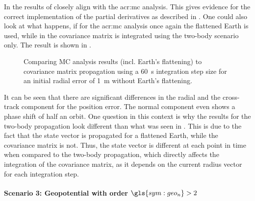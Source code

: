 In  the results of \neptune{} closely align with the \gls{acr:mc} analysis. This gives evidence for the correct implementation of the partial derivatives as described in . One could also look at what happens, if for the \gls{acr:mc} analysis once again the flattened Earth is used, while in \neptune{} the covariance matrix is integrated using the two-body scenario only. The result is shown in .
\begin{figure}[h!]
  \centering
  \hspace{1cm}
  \caption{Comparing MC analysis results (incl. Earth's flattening) to \neptune{} covariance matrix propagation using a \SI{60}{\second} integration step size for an initial radial error of \SI{1}{\metre} without Earth's flattening. \label{fig:val-cov-scen2-02}}
\end{figure}
It can be seen that there are significant differences in the radial and the cross-track component for the position error. The normal component even shows a phase shift of half an orbit. One question in this context is why the \neptune{} results for the two-body propagation look different than what was seen in 
. This is due to the fact that the state vector is propagated for a flattened Earth, while the covariance matrix is not. Thus, the state vector is different at each point in time when compared to the two-body propagation, which directly affects the integration of the covariance matrix, as it depends on the current radius vector for each integration step.

\paragraph{Scenario 3: Geopotential with order $\gls{sym:geo_n}>2$}

